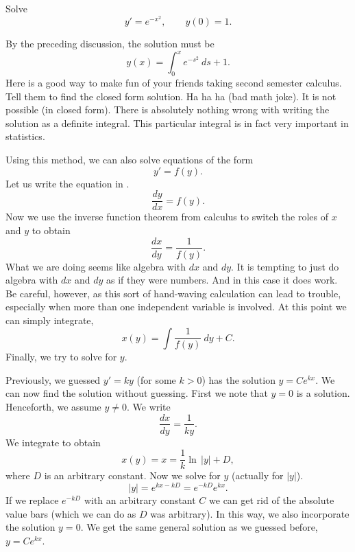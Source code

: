 \documentclass[12pt]{book}
\begin{document}
\begin{example}
Solve
\begin{equation*}
y' = e^{-x^2}, \qquad y(0) = 1 .
\end{equation*}

By the preceding discussion, the solution must be
\begin{equation*}
y(x) = \int_0^x e^{-s^2} ~ds + 1 .
\end{equation*}
Here is a good way to make fun of your friends taking second semester
calculus.  Tell them to
find the closed form solution.  Ha ha ha (bad math joke).  It is
not possible (in closed form).
There is absolutely nothing wrong with writing the solution as a
definite integral.
This particular integral
is in fact very important
in statistics.
\end{example}

Using this method, we can also solve equations of the form
\begin{equation*}
y' = f(y) .
\end{equation*}
Let us write the equation in .
\begin{equation*}
\frac{dy}{dx} = f(y) .
\end{equation*}
Now we use the inverse function theorem from calculus
to switch the roles of $x$ and $y$
to obtain
\begin{equation*}
\frac{dx}{dy} = \frac{1}{f(y)} .
\end{equation*}
What
we are doing seems like algebra with $dx$ and $dy$.
It is tempting to just do algebra with $dx$
and $dy$ as if they were numbers.  And in this case it does work.  Be
careful,
however, as this sort of hand-waving calculation can lead to trouble,
especially when
more than one independent variable is involved.
At this point we can simply integrate,
\begin{equation*}
x(y) = \int \frac{1}{f(y)} ~dy + C .
\end{equation*}
Finally, we try to solve for $y$.

\begin{example}
Previously, we guessed $y' = ky$ (for some $k > 0$) has the solution
$y=Ce^{kx}$.  We can now find the solution without guessing.
First we note that $y=0$ is a solution.
Henceforth, we assume $y\not= 0$.  We write
\begin{equation*}
\frac{dx}{dy} = \frac{1}{ky} .
\end{equation*}
We integrate to obtain
\begin{equation*}
x(y) = x = \frac{1}{k} \ln \, \lvert y \rvert + D,
\end{equation*}
where $D$ is an arbitrary constant.
Now we solve for $y$ (actually for $\lvert y \rvert$).
\begin{equation*}
\lvert y \rvert =
e^{kx-kD} = 
e^{-kD} e^{k x} .
\end{equation*}
If we replace $e^{-kD}$ with an arbitrary constant $C$ we can
get rid of the absolute value bars (which we can do as $D$ was arbitrary).  In
this way, we
also incorporate the solution $y=0$.  We get the same general solution as
we guessed before, $y = Ce^{kx}$.
\end{example}
\end{document}
